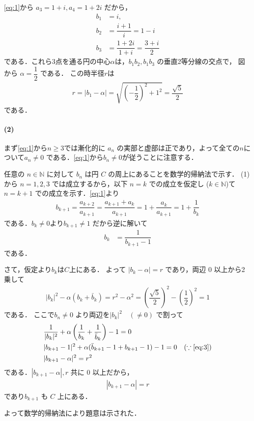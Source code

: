 \documentclass[../../main.tex]{subfiles}
\begin{document}
\cref{eq:1}から $a_3 = 1+i, a_4 = 1+2i$ だから，
\begin{align}
  b_1 &= i, \\
  b_2 &= \dfrac{i+1}{i} = 1-i \\
  b_3 &= \dfrac{1+2i}{1+i} = \dfrac{3+i}{2}
\end{align}
である．これら3点を通る円の中心$\alpha$は，$b_1 b_2, b_1 b_3$ の垂直2等分線の交点で，
図から $\alpha=\dfrac{1}{2}$ である．
この時半径$r$は
\begin{align}
  r = |b_1-\alpha| = \sqrt{\left(-\dfrac{1}{2}\right)^2 + 1^2} = \dfrac{\sqrt{5}}{2} \label{eq:2}
\end{align}
である．

\paragraph{(2)}

まず\cref{eq:1}から$n \ge 3$では漸化的に $a_n$ の実部と虚部は正であり，よって全ての$n$について$ a_n \neq 0$ である．\cref{eq:1}から$b_n \neq 0$が従うことに注意する．

任意の $n \in \mathbb{N}$ に対して $b_n$ は円 $C$ の周上にあることを数学的帰納法で示す．
(1)から $n=1,2,3$ では成立するから，以下 $n=k$ での成立を仮定し ($k \in \mathbb{N}$)て $n=k+1$ での成立を示す．\cref{eq:1}より
\begin{align}
  b_{k+1}
  = \dfrac{a_{k+2}}{a_{k+1}}
  = \dfrac{a_{k+1}+a_{k}}{a_{k+1}}
  = 1 + \dfrac{a_k}{a_{k+1}}
  = 1 + \dfrac{1}{b_k}
\end{align}
である．$b_k \neq 0$より$b_{k+1} \neq 1$ だから逆に解いて
\begin{align}
  b_k &= \dfrac{1}{b_{k+1}-1} \label{eq:3}
\end{align}
である．

さて，仮定より$b_k$は$C$上にある．
よって $|b_k - \alpha| = r$ であり，両辺 $0$ 以上から2乗して
\begin{align}
  |b_k|^2 - \alpha(b_k + \bar{b}_k) = r^2 - \alpha^2 = \left(\dfrac{\sqrt{5}}{2}\right)^2-\left(\dfrac{1}{2}\right)^2 = 1
\end{align}
である．
ここで$b_n \neq 0$ より両辺を$|b_k|^2 \quad (\neq 0)$ で割って
\begin{align}
  & \dfrac{1}{|b_k|^2} + \alpha \left( \dfrac{1}{b_k} + \dfrac{1}{\bar{b}_k} \right) - 1 = 0 \\
  & |b_{k+1}-1|^2 + \alpha( \bar{b}_{k+1}-1 + b_{k+1}-1 ) - 1 = 0 \quad (\because \text{\cref{eq:3}}) \\
  & |b_{k+1} - \alpha|^2 = r^2
\end{align}
である．$|b_{k+1} - \alpha|, r$ 共に $0$ 以上だから，
\begin{align}
  |b_{k+1} - \alpha| = r
\end{align}
であり$b_{k+1}$ も $C$ 上にある．

よって数学的帰納法により題意は示された．
\end{document}
